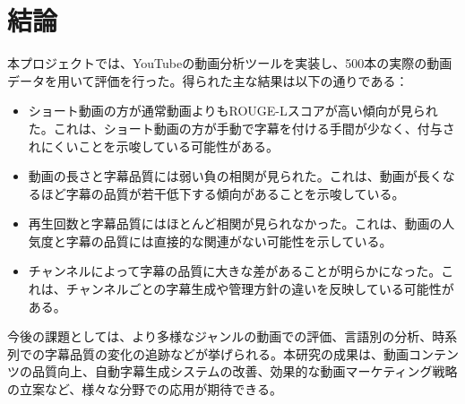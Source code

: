 \documentclass[11pt, a4paper]{ltjsarticle}
\begin{document}
\section{結論}
本プロジェクトでは、YouTubeの動画分析ツールを実装し、500本の実際の動画データを用いて評価を行った。得られた主な結果は以下の通りである：

\begin{itemize}
  \item ショート動画の方が通常動画よりもROUGE-Lスコアが高い傾向が見られた。これは、ショート動画の方が手動で字幕を付ける手間が少なく、付与されにくいことを示唆している可能性がある。
  \item 動画の長さと字幕品質には弱い負の相関が見られた。これは、動画が長くなるほど字幕の品質が若干低下する傾向があることを示唆している。
  \item 再生回数と字幕品質にはほとんど相関が見られなかった。これは、動画の人気度と字幕の品質には直接的な関連がない可能性を示している。
  \item チャンネルによって字幕の品質に大きな差があることが明らかになった。これは、チャンネルごとの字幕生成や管理方針の違いを反映している可能性がある。
\end{itemize}

今後の課題としては、より多様なジャンルの動画での評価、言語別の分析、時系列での字幕品質の変化の追跡などが挙げられる。本研究の成果は、動画コンテンツの品質向上、自動字幕生成システムの改善、効果的な動画マーケティング戦略の立案など、様々な分野での応用が期待できる。
\end{document}
